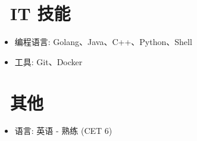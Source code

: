 \documentclass{resume}
\begin{document}


\section{\faCogs\ IT 技能}
\begin{itemize}[parsep=0.5ex]
  \item 编程语言: Golang、Java、C++、Python、Shell
  \item 工具: Git、Docker
\end{itemize}


\section{\faInfo\ 其他}
\begin{itemize}[parsep=0.5ex]
  \item 语言: 英语 - 熟练 (CET 6)
\end{itemize}

%
%
\end{document}
